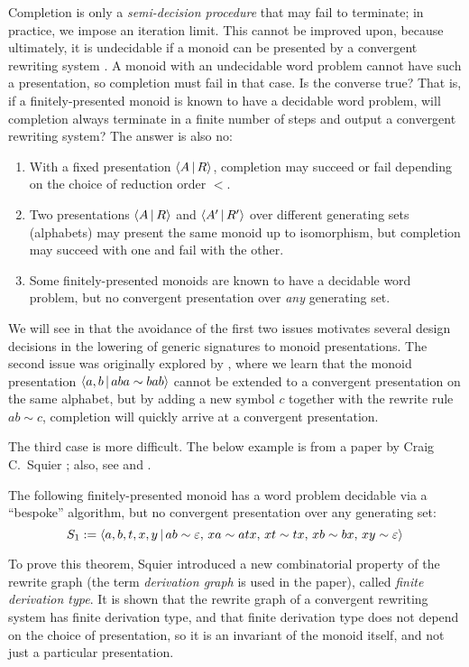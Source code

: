 \documentclass[../generics]{subfiles}
\begin{document}
Completion is only a \emph{semi-decision procedure} that may fail to terminate; in practice, we impose an iteration limit. This cannot be improved upon, because ultimately, it is undecidable if a monoid can be presented by a convergent rewriting system \cite{ODUNLAING1983339}. A monoid with an undecidable word problem cannot have such a presentation, so completion must fail in that case. Is the converse true? That is, if a finitely-presented monoid is known to have a decidable word problem, will completion always terminate in a finite number of steps and output a convergent rewriting system? The answer is also no:
\begin{enumerate}
\item With a fixed presentation $\langle A\,|\,R\rangle$, completion may succeed or fail depending on the choice of reduction order $<$.
\item Two presentations $\langle A\,|\,R\rangle$ and $\langle A^\prime\,|\,R^\prime\rangle$ over different generating sets (alphabets) may present the same monoid up to isomorphism, but completion may succeed with one and fail with the other.
\item Some finitely-presented monoids are known to have a decidable word problem, but no convergent presentation over \emph{any} generating set.
\end{enumerate}
We will see in  that the avoidance of the first two issues motivates several design decisions in the lowering of generic signatures to monoid presentations. The second issue was originally explored by \cite{KAPUR1985337}, where we learn that the monoid presentation $\langle a,b\,|\,aba\sim bab\rangle$ cannot be extended to a convergent presentation on the same alphabet, but by adding a new symbol $c$ together with the rewrite rule $ab\sim c$, completion will quickly arrive at a convergent presentation.

The third case is more difficult. The below example is from a paper by Craig C.~Squier \cite{SQUIER1994271}; also, see \cite{Lafont1991ChurchRooserPA} and \cite{LAFONT1995229}.
\begin{theorem}\label{squier s1} The following finitely-presented monoid has a word problem decidable via a ``bespoke'' algorithm, but no convergent presentation over any generating set:
\[S_1:=\langle a,b,t,x,y\,|\,ab\sim \varepsilon,\,xa\sim atx,\,xt\sim tx,\,xb\sim bx,\,xy\sim \varepsilon\rangle\]
\end{theorem}
To prove this theorem, Squier introduced a new combinatorial property of the rewrite graph (the term \emph{derivation graph} is used in the paper), called \emph{finite derivation type}. It is shown that the rewrite graph of a convergent rewriting system has finite derivation type, and that finite derivation type does not depend on the choice of presentation, so it is an invariant of the monoid itself, and not just a particular presentation.
\end{document}
